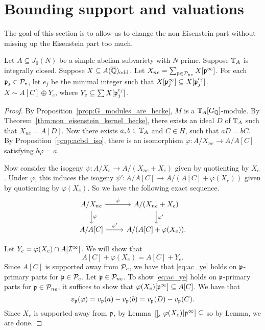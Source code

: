 \documentclass[thesis.tex]{subfiles}
\begin{document}
\section{Bounding support and valuations}%
\label{sec:bounding_support_and_valuations}

The goal of this section is to allow us to change the non-Eisenstein part
without missing up the Eisenstein part too much.


\begin{proposition}
    Let $A\subseteq J_0(N)$ be a simple abelian subvariety with $N$ prime.
    Suppose $\TT_A$ is integrally closed. Suppose $X\subseteq A(\QQbar)_\odd$.
    Let $X_{ne} = \sum_{\p \in \P_{ne}} X[\p^\infty]$. For each $\p_j\in \P_e$,
    let $e_j$ be the minimal integer such that $X[\p_j ^\infty]\subseteq X[\p_j
    ^{e_j}]$. $X\sim A[C]\oplus Y_e$, where $Y_e\subseteq \sum X[\p_j ^{e_j}]$.
\end{proposition}
\begin{proof}
    By Proposition~\ref{prop:G_modules_are_hecke}, $M$ is a
    $\TT_A[G_\QQ]$-module. By Theorem~\ref{thm:non_eisenstein_kernel_hecke},
    there exists an ideal $D$ of $\TT_A$ such that $X_{ne}=A[D]$. Now there
    exists $a,b\in \TT_A$ and $C\in H$, such that $aD=bC$. By
    Proposition~\ref{prop:acbd_iso}, there is an isomorphism $\varphi:A/X_{ne}\to
    A/A[C]$ satisfying $b\varphi=a$.

    Now consider the isogeny $\psi:A/X_e\to A/(X_{ne}+X_e)$ given by
    quotienting by $X_e$. Under $\varphi$, this
    induces the isogeny $\psi':A/A[C]\to A/(A[C]+\varphi(X_e))$ given by
    quotienting by $\varphi(X_e)$. So we have the following exact sequence.
    \[
        \begin{tikzcd}
            A/X_{ne}
            \arrow[r, "\psi"]
            \arrow[d, "\varphi"]
            &
            A/(X_{ne}+X_e)
            \arrow[d, "\varphi'"]
            \\
            A/A[C]
            \arrow[r, "\psi'"]
            &
            A/(A[C]+\varphi(X_e)).
        \end{tikzcd}
    \] 

    Let $Y_e = \varphi(X_e)\cap A[\I^\infty]$. We will show that
    \begin{equation}
        \label{eq:ac_ye}
        A[C]+\varphi(X_e) = A[C]+Y_e.
    \end{equation}
    Since $A[C]$ is supported away from $\P_e$, we have that \eqref{eq:ac_ye}
    holds on $\p$-primary parts for $\p\in \P_e$. Let $\p\in \P_{ne}$. To show
    \eqref{eq:ac_ye} holds on $\p$-primary parts for $\p \in \P_{ne}$, it
    suffices to show that $\varphi(X_e)[\p^\infty]\subseteq A[C]$. We have that
    \[
        v_\p(\varphi) = v_\p(a)-v_\p(b) = v_\p(D) - v_\p(C).
    \]
    Since $X_e$ is supported away from $\p$, by Lemma~\ref{},
    $\varphi(X_e)[\p^\infty] \subseteq $ so by Lemma, we are done.
\end{proof}
\end{document}
